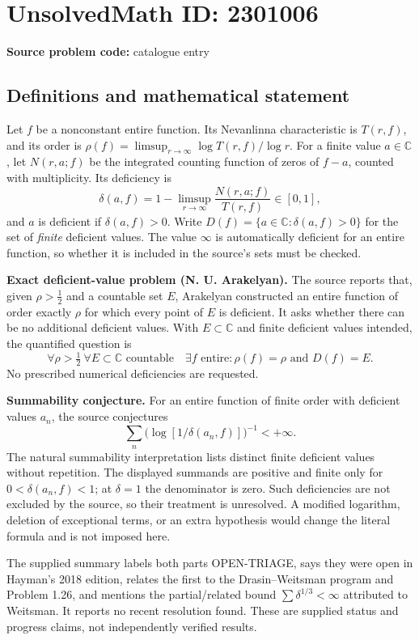 \documentclass[11pt]{article}
\newcommand{\C}{\mathbb{C}}
\begin{document}
\section*{UnsolvedMath ID: 2301006}
\textbf{Source problem code:} catalogue entry
\subsection{Definitions and mathematical statement}
Let $f$ be a nonconstant entire function. Its Nevanlinna characteristic is $T(r,f)$, and its order is $\rho(f)=\limsup_{r\to\infty}\log T(r,f)/\log r$. For a finite value $a\in\C$, let $N(r,a;f)$ be the integrated counting function of zeros of $f-a$, counted with multiplicity. Its deficiency is
\[
 \delta(a,f)=1-\limsup_{r\to\infty}\frac{N(r,a;f)}{T(r,f)}\in[0,1],
\]
and $a$ is deficient if $\delta(a,f)>0$. Write $D(f)=\{a\in\C:\delta(a,f)>0\}$ for the set of \emph{finite} deficient values. The value $\infty$ is automatically deficient for an entire function, so whether it is included in the source's sets must be checked.

\textbf{Exact deficient-value problem (N. U. Arakelyan).} The source reports that, given $\rho>\tfrac12$ and a countable set $E$, Arakelyan constructed an entire function of order exactly $\rho$ for which every point of $E$ is deficient. It asks whether there can be no additional deficient values. With $E\subset\C$ and finite deficient values intended, the quantified question is
\[
 \forall\rho>\tfrac12\ \forall E\subset\C\text{ countable}\quad
 \exists f\text{ entire}:\rho(f)=\rho\text{ and }D(f)=E.
\]
No prescribed numerical deficiencies are requested.

\textbf{Summability conjecture.} For an entire function of finite order with deficient values $a_n$, the source conjectures
\[
 \sum_n\bigl(\log[1/\delta(a_n,f)]\bigr)^{-1}<+\infty.
\]
The natural summability interpretation lists distinct finite deficient values without repetition. The displayed summands are positive and finite only for $0<\delta(a_n,f)<1$; at $\delta=1$ the denominator is zero. Such deficiencies are not excluded by the source, so their treatment is unresolved. A modified logarithm, deletion of exceptional terms, or an extra hypothesis would change the literal formula and is not imposed here.

The supplied summary labels both parts OPEN-TRIAGE, says they were open in Hayman's 2018 edition, relates the first to the Drasin--Weitsman program and Problem 1.26, and mentions the partial/related bound $\sum\delta^{1/3}<\infty$ attributed to Weitsman. It reports no recent resolution found. These are supplied status and progress claims, not independently verified results.
\end{document}
